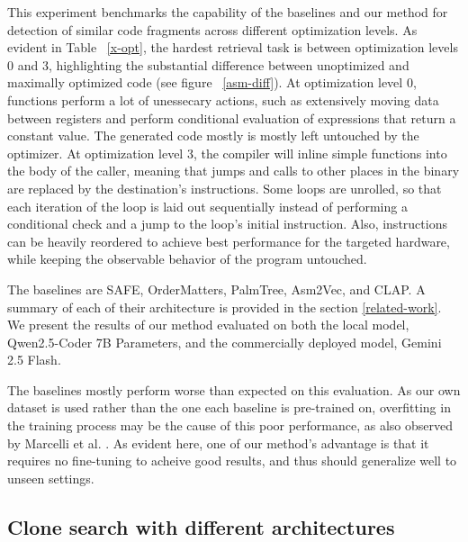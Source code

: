 This experiment benchmarks the capability of the baselines and our method for detection of similar code fragments across
different optimization levels. As evident in Table ~\ref{x-opt}, the hardest retrieval task is between optimization levels 0 and 3,
highlighting the substantial difference between unoptimized and maximally optimized code (see figure ~\ref{asm-diff}).
At optimization level 0, functions perform a lot of unessecary actions, such as extensively moving
data between registers and perform conditional evaluation of expressions that return a constant value. The generated code
mostly is mostly left untouched by the optimizer. At optimization level 3, the compiler will inline simple functions into the
body of the caller, meaning that jumps and calls to other places in the binary are replaced by the destination's instructions.
Some loops are unrolled, so that each iteration of the loop is laid out sequentially instead of performing a conditional check
and a jump to the loop's initial instruction. Also, instructions can be heavily reordered to achieve best performance for the targeted
hardware, while keeping the observable behavior of the program untouched.

The baselines are SAFE, OrderMatters, PalmTree, Asm2Vec, and CLAP. A summary of each of their architecture is provided in the section \ref{related-work}.
We present the results of our method evaluated on both the local model, Qwen2.5-Coder 7B Parameters, and the commercially deployed model,
Gemini 2.5 Flash.

The baselines mostly perform worse than expected on this evaluation. As our own dataset is used
rather than the one each baseline is pre-trained on, overfitting in the training process may be the cause of this poor performance,
as also observed by Marcelli et al. \cite{cisco}. As evident here, one of our method's advantage is that it requires no fine-tuning
to acheive good results, and thus should generalize well to unseen settings.

\subsection{Clone search with different architectures}

